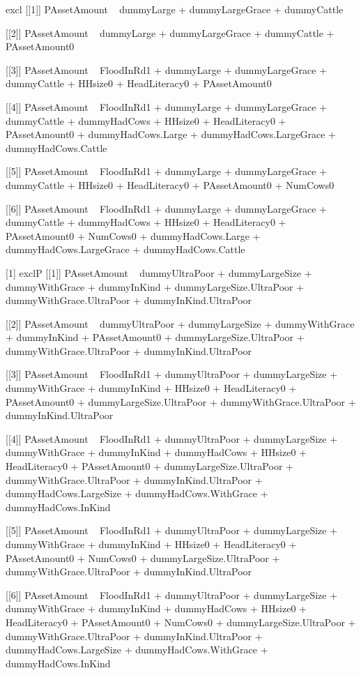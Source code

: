 \begin{Schunk}
\begin{Soutput}
[1] excl
[[1]]
PAssetAmount ~ dummyLarge + dummyLargeGrace + dummyCattle

[[2]]
PAssetAmount ~ dummyLarge + dummyLargeGrace + dummyCattle + PAssetAmount0

[[3]]
PAssetAmount ~ FloodInRd1 + dummyLarge + dummyLargeGrace + dummyCattle + 
    HHsize0 + HeadLiteracy0 + PAssetAmount0

[[4]]
PAssetAmount ~ FloodInRd1 + dummyLarge + dummyLargeGrace + dummyCattle + 
    dummyHadCows + HHsize0 + HeadLiteracy0 + PAssetAmount0 + 
    dummyHadCows.Large + dummyHadCows.LargeGrace + dummyHadCows.Cattle

[[5]]
PAssetAmount ~ FloodInRd1 + dummyLarge + dummyLargeGrace + dummyCattle + 
    HHsize0 + HeadLiteracy0 + PAssetAmount0 + NumCows0

[[6]]
PAssetAmount ~ FloodInRd1 + dummyLarge + dummyLargeGrace + dummyCattle + 
    dummyHadCows + HHsize0 + HeadLiteracy0 + PAssetAmount0 + 
    NumCows0 + dummyHadCows.Large + dummyHadCows.LargeGrace + 
    dummyHadCows.Cattle

[1] exclP
[[1]]
PAssetAmount ~ dummyUltraPoor + dummyLargeSize + dummyWithGrace + 
    dummyInKind + dummyLargeSize.UltraPoor + dummyWithGrace.UltraPoor + 
    dummyInKind.UltraPoor

[[2]]
PAssetAmount ~ dummyUltraPoor + dummyLargeSize + dummyWithGrace + 
    dummyInKind + PAssetAmount0 + dummyLargeSize.UltraPoor + 
    dummyWithGrace.UltraPoor + dummyInKind.UltraPoor

[[3]]
PAssetAmount ~ FloodInRd1 + dummyUltraPoor + dummyLargeSize + 
    dummyWithGrace + dummyInKind + HHsize0 + HeadLiteracy0 + 
    PAssetAmount0 + dummyLargeSize.UltraPoor + dummyWithGrace.UltraPoor + 
    dummyInKind.UltraPoor

[[4]]
PAssetAmount ~ FloodInRd1 + dummyUltraPoor + dummyLargeSize + 
    dummyWithGrace + dummyInKind + dummyHadCows + HHsize0 + HeadLiteracy0 + 
    PAssetAmount0 + dummyLargeSize.UltraPoor + dummyWithGrace.UltraPoor + 
    dummyInKind.UltraPoor + dummyHadCows.LargeSize + dummyHadCows.WithGrace + 
    dummyHadCows.InKind

[[5]]
PAssetAmount ~ FloodInRd1 + dummyUltraPoor + dummyLargeSize + 
    dummyWithGrace + dummyInKind + HHsize0 + HeadLiteracy0 + 
    PAssetAmount0 + NumCows0 + dummyLargeSize.UltraPoor + dummyWithGrace.UltraPoor + 
    dummyInKind.UltraPoor

[[6]]
PAssetAmount ~ FloodInRd1 + dummyUltraPoor + dummyLargeSize + 
    dummyWithGrace + dummyInKind + dummyHadCows + HHsize0 + HeadLiteracy0 + 
    PAssetAmount0 + NumCows0 + dummyLargeSize.UltraPoor + dummyWithGrace.UltraPoor + 
    dummyInKind.UltraPoor + dummyHadCows.LargeSize + dummyHadCows.WithGrace + 
    dummyHadCows.InKind


\end{Soutput}
\end{Schunk}
